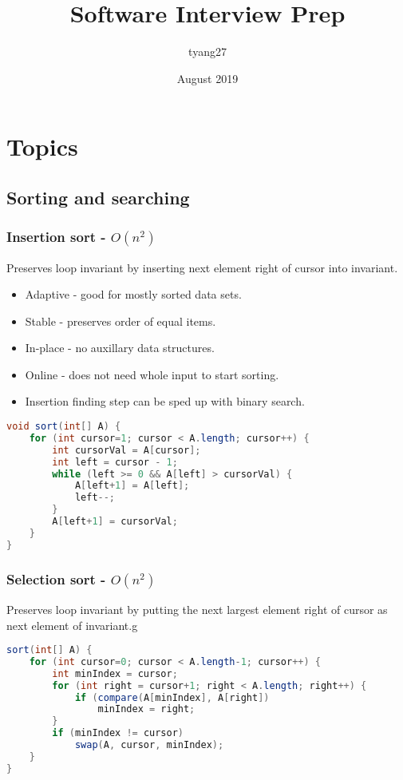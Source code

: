 \documentclass[10pt]{article}
\title{Software Interview Prep}
\author{tyang27}
\date{August 2019}
\begin{document}

\section{Topics}
\subsection{Sorting and searching}
\subsubsection{Insertion sort - $O(n^2)$}
Preserves loop invariant by inserting next element right of cursor into invariant.
\begin{itemize}
    \item Adaptive - good for mostly sorted data sets.
    \item Stable - preserves order of equal items.
    \item In-place - no auxillary data structures.
    \item Online - does not need whole input to start sorting.
    \item Insertion finding step can be sped up with binary search.
\end{itemize}
\begin{lstlisting}[language=java]
void sort(int[] A) {
    for (int cursor=1; cursor < A.length; cursor++) {
        int cursorVal = A[cursor];
        int left = cursor - 1;
        while (left >= 0 && A[left] > cursorVal) {
            A[left+1] = A[left];
            left--;
        }
        A[left+1] = cursorVal;
    }
}
\end{lstlisting}

\subsubsection{Selection sort - $O(n^2)$}
Preserves loop invariant by putting the next largest element right of cursor as next element of invariant.g
\begin{lstlisting}[language=java]
sort(int[] A) {
    for (int cursor=0; cursor < A.length-1; cursor++) {
        int minIndex = cursor;
        for (int right = cursor+1; right < A.length; right++) {
            if (compare(A[minIndex], A[right])
                minIndex = right;
        }
        if (minIndex != cursor)
            swap(A, cursor, minIndex);
    }
}
\end{lstlisting}
\end{document}
